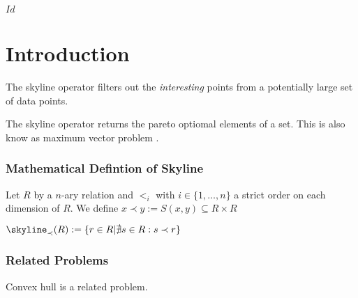 
\svnInfo $Id$

\chapter{Introduction\revision}
\label{chap:Introduction}


The skyline operator \citep{BKS2001} filters out the \emph{interesting} points from a potentially large set of data points.


The skyline operator returns the pareto optiomal elements of a set. This is also know as maximum vector problem \citep{BKS2001}.


\subsection{Mathematical Defintion of Skyline}

Let $R$ by a $n$-ary relation and $<_i$ with $i \in \{1, \ldots, n\}$
a strict order on each dimension of $R$.
We define $x \prec y := S(x, y) \subseteq R \times R$

$\skyline_\prec(R) := \{ r \in R | \nexists s \in R : s \prec r \}$

\subsection{Related Problems}
Convex hull is a related problem.

